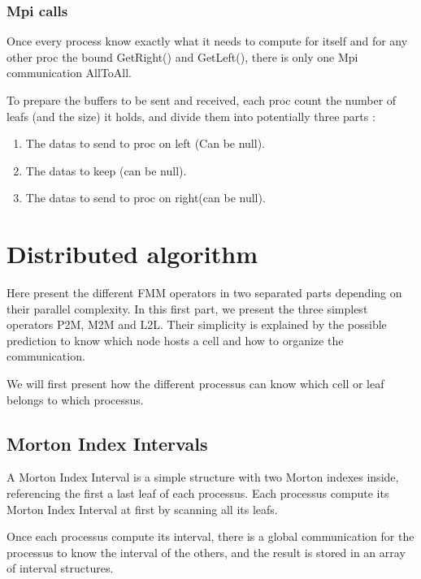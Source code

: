 \documentclass[12pt,letterpaper,titlepage]{report}
\begin{document}
\clearpage
\subsection{Mpi calls}
Once every process know exactly what it needs to compute for itself
and for any other proc the bound GetRight() and GetLeft(), there is
only one Mpi communication AllToAll.

To prepare the buffers to be sent and received, each proc count the
number of leafs (and the size) it holds, and divide them into
potentially three parts :
\begin{enumerate}
\item The datas to send to proc on left (Can be null).
\item The datas to keep (can be null).
\item The datas to send to proc on right(can be null).
\end{enumerate}


\chapter{Distributed algorithm} 

Here present the different FMM operators in two separated parts
depending on their parallel complexity.  In this first part, we
present the three simplest operators P2M, M2M and L2L.  Their
simplicity is explained by the possible prediction to know which node
hosts a cell and how to organize the communication.

We will first present how the different processus can know which cell
or leaf belongs to which processus.

\section{Morton Index Intervals}
A Morton Index Interval is a simple structure with two Morton indexes
inside, referencing the first a last leaf of each processus.  Each
processus compute its Morton Index Interval at first by scanning all
its leafs.

Once each processus compute its interval, there is a global
communication for the processus to know the interval of the others,
and the result is stored in an array of interval structures.
\end{document}
